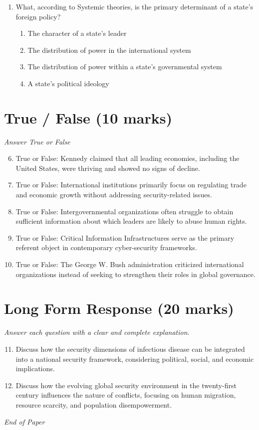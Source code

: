 \documentclass[12pt]{article}
\begin{document}
\begin{enumerate}[label=\arabic*.]
\begin{enumerate}[label=(\alph*)]
    \item Computer networks
\end{enumerate}
\item What, according to Systemic theories, is the primary determinant of a state's foreign policy?
\begin{enumerate}[label=(\alph*)]
    \item The character of a state's leader
    \item The distribution of power in the international system
    \item The distribution of power within a state's governmental system
    \item A state's political ideology
\end{enumerate}
\end{enumerate}

\section*{True / False (10 marks)}
\textit{Answer True or False}
\begin{enumerate}[label=\arabic*.]
\setcounter{enumi}{5}
\item True or False: Kennedy claimed that all leading economies, including the United States, were thriving and showed no signs of decline.
\item True or False: International institutions primarily focus on regulating trade and economic growth without addressing security-related issues.
\item True or False: Intergovernmental organizations often struggle to obtain sufficient information about which leaders are likely to abuse human rights.
\item True or False: Critical Information Infrastructures serve as the primary referent object in contemporary cyber-security frameworks.
\item True or False: The George W. Bush administration criticized international organizations instead of seeking to strengthen their roles in global governance.
\end{enumerate}

\section*{Long Form Response (20 marks)}
\textit{Answer each question with a clear and complete explanation.}
\begin{enumerate}[label=\arabic*.]
\setcounter{enumi}{10}
\item Discuss how the security dimensions of infectious disease can be integrated into a national security framework, considering political, social, and economic implications.
\item Discuss how the evolving global security environment in the twenty-first century influences the nature of conflicts, focusing on human migration, resource scarcity, and population disempowerment.
\end{enumerate}

\vfill
\noindent\textit{End of Paper}
\end{document}
